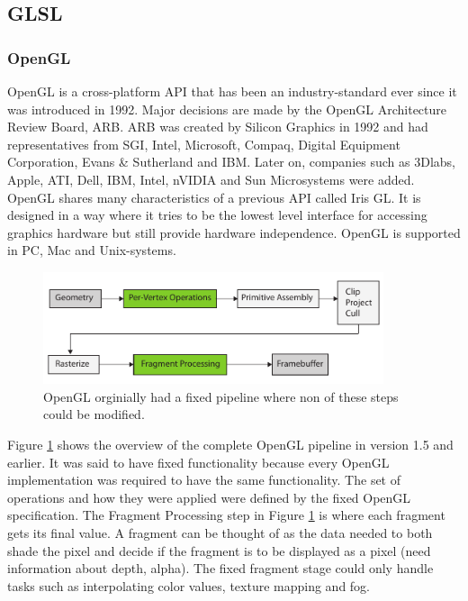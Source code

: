 \subsection{GLSL}

\subsubsection{OpenGL}

OpenGL is a cross-platform API that has been an industry-standard ever since it was introduced in 1992\cite{glredbook}. Major decisions are made by the OpenGL Architecture Review Board, ARB. ARB was created by Silicon Graphics in 1992 and had representatives from SGI, Intel, Microsoft, Compaq, Digital Equipment Corporation, Evans \& Sutherland and IBM. Later on, companies such as 3Dlabs, Apple, ATI, Dell, IBM, Intel, nVIDIA and Sun Microsystems were added. OpenGL shares many characteristics of a previous API called Iris GL. It is designed in a way where it tries to be the lowest level interface for accessing graphics hardware but still provide hardware independence. OpenGL is supported in PC, Mac and Unix-systems.

\begin{figure}[ht!]
\centering
\includegraphics[width=100mm]{img/glpipeline.pdf}
\caption{OpenGL orginially had a fixed pipeline where non of these steps could be modified.}
\label{glfixed}
\end{figure}

Figure \ref{glfixed} shows the overview of the complete OpenGL pipeline in version 1.5 and earlier. It was said to have fixed functionality because every OpenGL implementation was required to have the same functionality. The set of operations and how they were applied were defined by the fixed OpenGL specification. The Fragment Processing step in Figure \ref{glfixed} is where each fragment gets its final value. A fragment can be thought of as the data needed to both shade the pixel and decide if the fragment is to be displayed as a pixel (need information about depth, alpha). The fixed fragment stage could only handle tasks such as interpolating color values, texture mapping and fog. 


